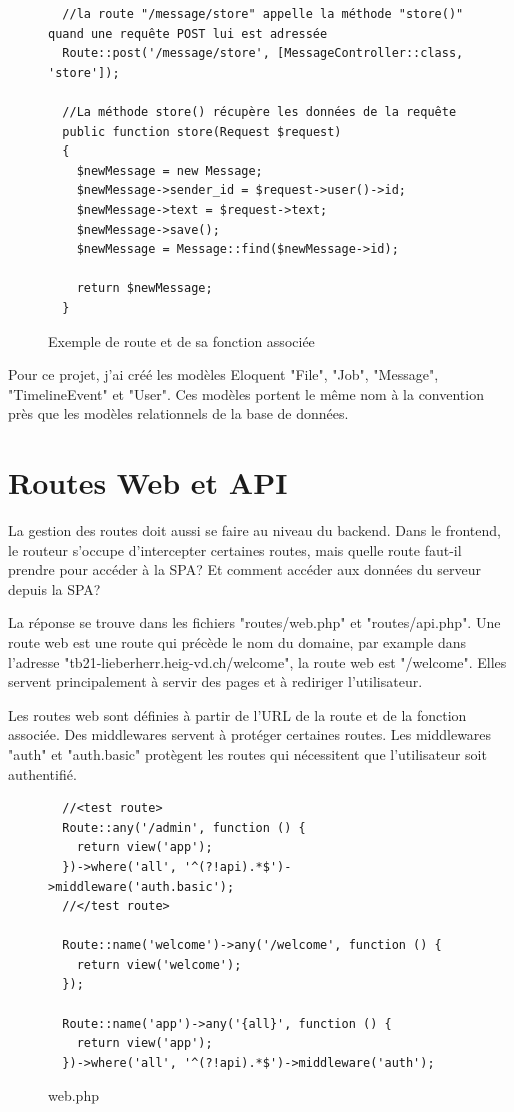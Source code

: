 \documentclass[
    iai, %
    eai, %
]{heig-tb}
\begin{document}
\newpage

\begin{figure}[h]
  \begin{verbatim}
  //la route "/message/store" appelle la méthode "store()" quand une requête POST lui est adressée
  Route::post('/message/store', [MessageController::class, 'store']);

  //La méthode store() récupère les données de la requête
  public function store(Request $request)
  {
    $newMessage = new Message;
    $newMessage->sender_id = $request->user()->id;
    $newMessage->text = $request->text;
    $newMessage->save();
    $newMessage = Message::find($newMessage->id);

    return $newMessage;
  }
  \end{verbatim}
  \caption{Exemple de route et de sa fonction associée}
\end{figure}

Pour ce projet, j'ai créé les modèles Eloquent "File", "Job", "Message", "TimelineEvent" et "User". Ces modèles portent le même nom à la convention près que les modèles relationnels de la base de données.

\newpage
\section{Routes Web et API}
\label{section:API}
La gestion des routes doit aussi se faire au niveau du backend. Dans le frontend, le routeur s'occupe d'intercepter certaines routes, mais quelle route faut-il prendre pour accéder à la SPA?
Et comment accéder aux données du serveur depuis la SPA?

La réponse se trouve dans les fichiers "routes/web.php" et "routes/api.php". Une route web est une route qui précède le nom du domaine, par example dans l'adresse "tb21-lieberherr.heig-vd.ch/welcome", la route web est "/welcome". Elles servent principalement à servir des pages et à rediriger l'utilisateur.

Les routes web sont définies à partir de l'URL de la route et de la fonction associée. Des middlewares servent à protéger certaines routes. Les middlewares "auth" et "auth.basic" protègent les routes qui nécessitent que l'utilisateur soit authentifié.

\begin{figure}[h]
  \begin{verbatim}
  //<test route>
  Route::any('/admin', function () {
    return view('app');
  })->where('all', '^(?!api).*$')->middleware('auth.basic');
  //</test route>

  Route::name('welcome')->any('/welcome', function () {
    return view('welcome');
  });

  Route::name('app')->any('{all}', function () {
    return view('app');
  })->where('all', '^(?!api).*$')->middleware('auth');
  \end{verbatim}
  \caption{web.php}
\end{figure}
\end{document}
